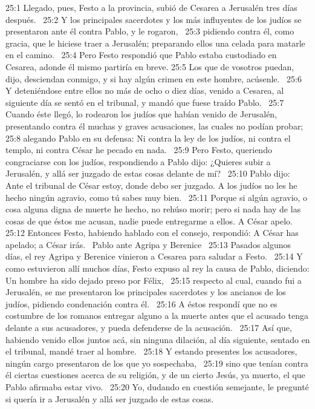 25:1 Llegado, pues, Festo a la provincia, subió de Cesarea a Jerusalén tres días después.  
25:2 Y los principales sacerdotes y los más influyentes de los judíos se presentaron ante él contra Pablo, y le rogaron,  
25:3 pidiendo contra él, como gracia, que le hiciese traer a Jerusalén; preparando ellos una celada para matarle en el camino.  
25:4 Pero Festo respondió que Pablo estaba custodiado en Cesarea, adonde él mismo partiría en breve. 
25:5 Los que de vosotros puedan, dijo, desciendan conmigo, y si hay algún crimen en este hombre, acúsenle.  
25:6 Y deteniéndose entre ellos no más de ocho o diez días, venido a Cesarea, al siguiente día se sentó en el tribunal, y mandó que fuese traído Pablo.  
25:7 Cuando éste llegó, lo rodearon los judíos que habían venido de Jerusalén, presentando contra él muchas y graves acusaciones, las cuales no podían probar;  
25:8 alegando Pablo en su defensa: Ni contra la ley de los judíos, ni contra el templo, ni contra César he pecado en nada.  
25:9 Pero Festo, queriendo congraciarse con los judíos, respondiendo a Pablo dijo: ¿Quieres subir a Jerusalén, y allá ser juzgado de estas cosas delante de mí?  
25:10 Pablo dijo: Ante el tribunal de César estoy, donde debo ser juzgado. A los judíos no les he hecho ningún agravio, como tú sabes muy bien.  
25:11 Porque si algún agravio, o cosa alguna digna de muerte he hecho, no rehúso morir; pero si nada hay de las cosas de que éstos me acusan, nadie puede entregarme a ellos. A César apelo.  
25:12 Entonces Festo, habiendo hablado con el consejo, respondió: A César has apelado; a César irás.  
Pablo ante Agripa y Berenice  
25:13 Pasados algunos días, el rey Agripa y Berenice vinieron a Cesarea para saludar a Festo.  
25:14 Y como estuvieron allí muchos días, Festo expuso al rey la causa de Pablo, diciendo: Un hombre ha sido dejado preso por Félix,  
25:15 respecto al cual, cuando fui a Jerusalén, se me presentaron los principales sacerdotes y los ancianos de los judíos, pidiendo condenación contra él.  
25:16 A éstos respondí que no es costumbre de los romanos entregar alguno a la muerte antes que el acusado tenga delante a sus acusadores, y pueda defenderse de la acusación.  
25:17 Así que, habiendo venido ellos juntos acá, sin ninguna dilación, al día siguiente, sentado en el tribunal, mandé traer al hombre.  
25:18 Y estando presentes los acusadores, ningún cargo presentaron de los que yo sospechaba,  
25:19 sino que tenían contra él ciertas cuestiones acerca de su religión, y de un cierto Jesús, ya muerto, el que Pablo afirmaba estar vivo.  
25:20 Yo, dudando en cuestión semejante, le pregunté si quería ir a Jerusalén y allá ser juzgado de estas cosas.  
